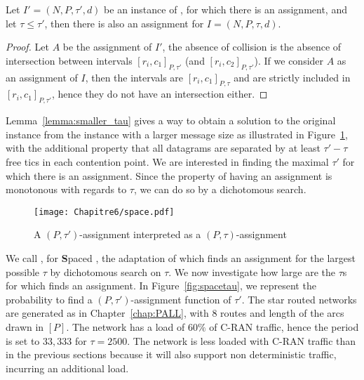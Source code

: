     \begin{lemma}\label{lemma:smaller_tau}
    Let $I' = (N,P,\tau',d)$ be an instance of \pall, for which there is an assignment, and let 
    $\tau \leq \tau'$, then there is also an assignment for $I = (N,P,\tau,d)$.
    \end{lemma}  
    \begin{proof}
    Let $A$ be the assignment of $I'$, the absence of collision is the absence of 
    intersection between intervals $[r_i,c_1]_{P,\tau'}$ (and $[r_i,c_2]_{P,\tau'}$). 
    If we consider $A$ as an assignment of $I$, then the intervals are $[r_i,c_1]_{P,\tau}$ and 
    are strictly included in $[r_i,c_1]_{P,\tau'}$, hence they do not have an intersection either. 
    \end{proof}

    Lemma~\ref{lemma:smaller_tau} gives a way to obtain a solution to the original instance from the instance with a larger message size as illustrated in Figure~\ref{fig:space}, with the additional property that all datagrams are separated
    by at least $\tau' - \tau$ free tics in each contention point. We are interested in finding the maximal $\tau'$
    for which there is an assignment. Since the property of having an assignment is monotonous with regards to $\tau$,
    we can do so by a dichotomous search.

           \begin{figure}
       \begin{center}
      \texttt{[image: Chapitre6/space.pdf]}
      \end{center} 
      \caption{A $(P,\tau')$-assignment interpreted as a $(P,\tau)$-assignment}
      \label{fig:space}   
     \end{figure}   


    We call \SPMLS, for \textbf{S}paced \PMLS, the adaptation of \PMLS which finds an assignment for the largest possible $\tau$ by dichotomous search on $\tau$. We now investigate how large are the $\tau$s for which \SPMLS finds an assignment. In Figure~\ref{fig:spacetau}, we represent the probability to find a $(P,\tau')$-assignment function of $\tau'$. The star routed networks are generated as in Chapter~\ref{chap:PALL}, with $8$ routes and length of the arcs drawn in $[P]$. The network has a load of $60\%$ of C-RAN traffic, hence the period is set to $33,333$ for $\tau = 2500$. The network is less loaded with C-RAN traffic than in the previous sections because it will also support non deterministic traffic, incurring an additional load.

